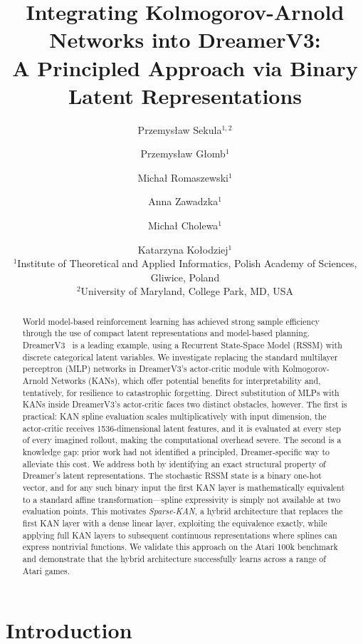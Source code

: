 \documentclass[11pt, a4paper]{article}
\title{\textbf{Integrating Kolmogorov-Arnold Networks into DreamerV3:\\
A Principled Approach via Binary Latent Representations}}
\author{
  Przemys\l{}aw Sekula$^{1,2}$ \and
  Przemys\l{}aw G\l{}omb$^{1}$ \and
  Micha\l{} Romaszewski$^{1}$ \and
  Anna Zawadzka$^{1}$ \and
  Micha\l{} Cholewa$^{1}$ \and
  Katarzyna Ko\l{}odziej$^{1}$
  \\[0.8em]
  \normalsize
  $^{1}$Institute of Theoretical and Applied Informatics,
  Polish Academy of Sciences, Gliwice, Poland\\
  $^{2}$University of Maryland, College Park, MD, USA
}
\date{}
\begin{document}
\maketitle

\begin{abstract}
World model-based reinforcement learning has achieved strong sample efficiency
through the use of compact latent representations and model-based planning.
DreamerV3~\cite{hafner2023dreamerv3} is a leading example, using a Recurrent
State-Space Model (RSSM) with discrete categorical latent variables. We
investigate replacing the standard multilayer perceptron (MLP) networks in
DreamerV3's actor-critic module with Kolmogorov-Arnold Networks (KANs), which
offer potential benefits for interpretability and, tentatively, for resilience
to catastrophic forgetting. Direct substitution of MLPs with KANs inside
DreamerV3's actor-critic faces two distinct obstacles, however. The first is
practical: KAN spline evaluation scales multiplicatively with input dimension,
the actor-critic receives 1536-dimensional latent features, and it is evaluated
at every step of every imagined rollout, making the computational overhead
severe. The second is a knowledge gap: prior work had not identified a
principled, Dreamer-specific way to alleviate this cost. We address both by
identifying an exact structural property of Dreamer's latent representations.
The stochastic RSSM state is a binary one-hot vector, and for any such binary
input the first KAN layer is mathematically equivalent to a standard affine
transformation---spline expressivity is simply not available at two evaluation
points. This motivates \emph{Sparse-KAN}, a hybrid architecture that replaces
the first KAN layer with a dense linear layer, exploiting the equivalence
exactly, while applying full KAN layers to subsequent continuous representations
where splines can express nontrivial functions. We validate this approach on
the Atari 100k benchmark and demonstrate that the hybrid architecture
successfully learns across a range of Atari games.
\end{abstract}

\section{Introduction}
\end{document}
